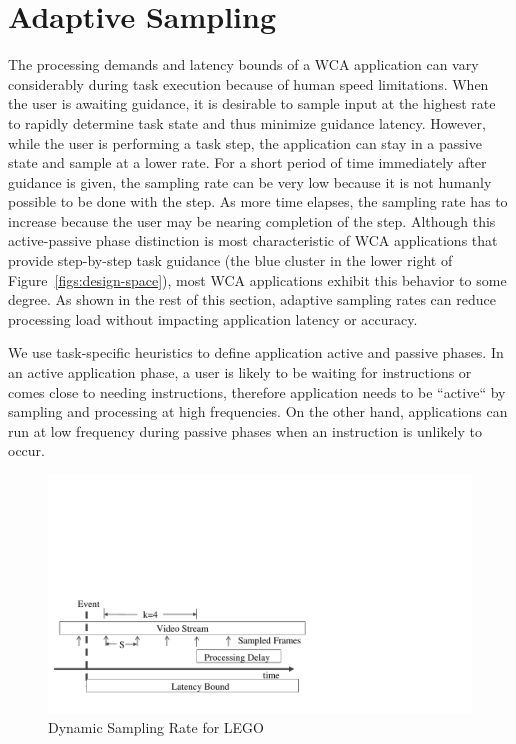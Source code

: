 \section{Adaptive Sampling}

The processing demands and latency bounds of a WCA application can
vary considerably during task execution because of human speed
limitations.  When the user is awaiting guidance, it is desirable to
sample input at the highest rate to rapidly determine task state and
thus minimize guidance latency.  However, while the user is performing
a task step, the application can stay in a passive state and sample at
a lower rate.  For a short period of time immediately after guidance
is given, the sampling rate can be very low because it is not humanly
possible to be done with the step.  As more time elapses, the
sampling rate has to increase because the user may be nearing
completion of the step.  Although this active-passive phase
distinction is most characteristic of WCA applications that provide
step-by-step task guidance (the blue cluster in
the lower right of Figure~\ref{figs:design-space}), most WCA
applications exhibit this behavior to some degree.  As shown in the
rest of this section, adaptive sampling rates can reduce processing
load without impacting application latency or accuracy.

We use task-specific heuristics to define application active and
passive phases.  In an active application phase, a user is likely to
be waiting for instructions or comes close to needing instructions,
therefore application needs to be ``active`` by sampling and
processing at high frequencies. On the other hand, applications can
run at low frequency during passive phases when an instruction is
unlikely to occur.

\begin{figure}
\centering
\includegraphics[width=\textwidth,trim=0em 3em 20em 15em, clip]{FIGS/fig-lego-sampling-model.pdf}
\caption{\small Dynamic Sampling Rate for LEGO}
\label{fig:lego-sampling-model}
\end{figure}

